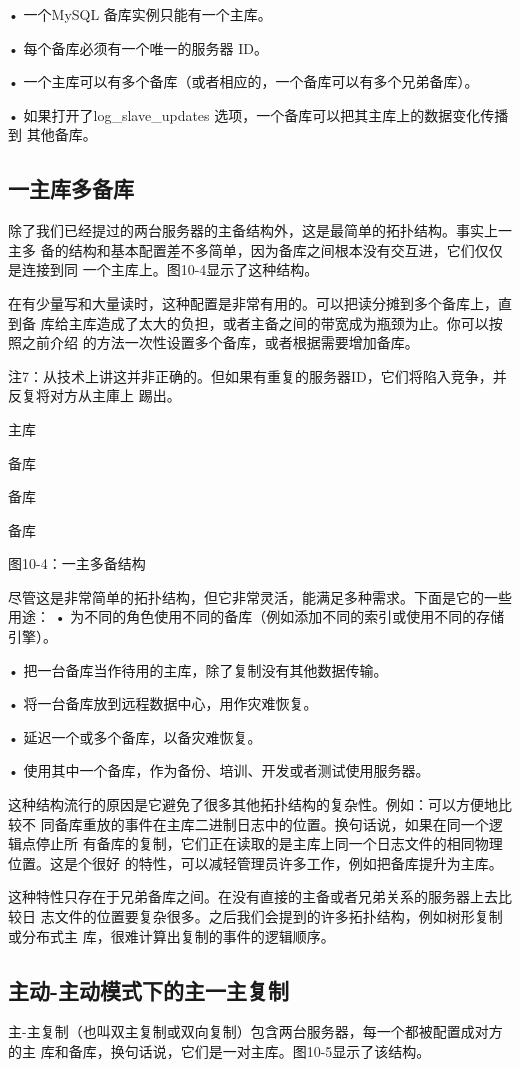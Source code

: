 • 一个MySQL 备库实例只能有一个主库。

• 每个备库必须有一个唯一的服务器 ID。

• 一个主库可以有多个备库（或者相应的，一个备库可以有多个兄弟备库）。

• 如果打开了log\_slave\_updates 选项，一个备库可以把其主库上的数据变化传播到
其他备库。

\subsection{一主库多备库}
除了我们已经提过的两台服务器的主备结构外，这是最简单的拓扑结构。事实上一主多
备的结构和基本配置差不多简单，因为备库之间根本没有交互进，它们仅仅是连接到同
一个主库上。图10-4显示了这种结构。

在有少量写和大量读时，这种配置是非常有用的。可以把读分摊到多个备库上，直到备
库给主库造成了太大的负担，或者主备之间的带宽成为瓶颈为止。你可以按照之前介绍
的方法一次性设置多个备库，或者根据需要增加备库。

注7：从技术上讲这并非正确的。但如果有重复的服务器ID，它们将陷入竞争，并反复将对方从主庫上
踢出。

主库

备库

备库

备库

图10-4：一主多备结构

尽管这是非常简单的拓扑结构，但它非常灵活，能满足多种需求。下面是它的一些用途：
• 为不同的角色使用不同的备库（例如添加不同的索引或使用不同的存储引擎）。

• 把一台备库当作待用的主库，除了复制没有其他数据传输。

• 将一台备库放到远程数据中心，用作灾难恢复。

• 延迟一个或多个备库，以备灾难恢复。

• 使用其中一个备库，作为备份、培训、开发或者测试使用服务器。

这种结构流行的原因是它避免了很多其他拓扑结构的复杂性。例如：可以方便地比较不
同备库重放的事件在主库二进制日志中的位置。换句话说，如果在同一个逻辑点停止所
有备库的复制，它们正在读取的是主库上同一个日志文件的相同物理位置。这是个很好
的特性，可以减轻管理员许多工作，例如把备库提升为主库。

这种特性只存在于兄弟备库之间。在没有直接的主备或者兄弟关系的服务器上去比较日
志文件的位置要复杂很多。之后我们会提到的许多拓扑结构，例如树形复制或分布式主
库，很难计算出复制的事件的逻辑顺序。

\subsection{主动-主动模式下的主一主复制}
主-主复制（也叫双主复制或双向复制）包含两台服务器，每一个都被配置成对方的主
库和备库，换句话说，它们是一对主库。图10-5显示了该结构。

